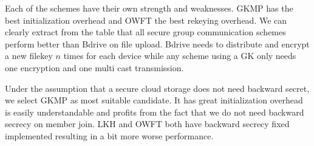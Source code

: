 Each of the schemes have their own strength and weaknesses. \ac{GKMP} has the best initialization overhead and \ac{OWFT} the best rekeying overhead. We can clearly extract from the table that all secure group communication schemes perform better than Bdrive on file upload. Bdrive needs to distribute and encrypt a new filekey $n$ times for each device while any scheme using a \ac{GK} only needs one encryption and one multi cast transmission. 

Under the assumption that a secure cloud storage does not need backward secret, we select \ac{GKMP} as most suitable candidate. It has great initialization overhead is easily understandable and profits from the fact that we do not need backward secrecy on member join. \ac{LKH} and \ac{OWFT} both have backward secrecy fixed implemented resulting in a bit more worse performance. 